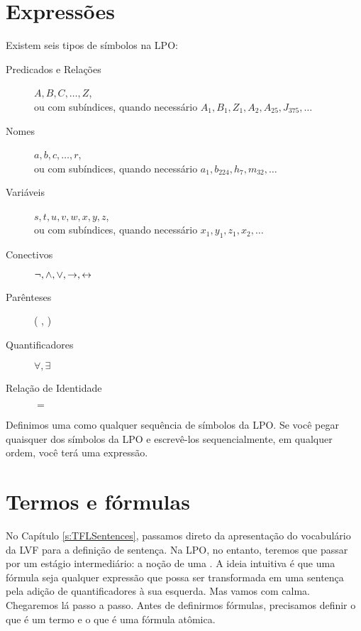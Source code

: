 \section{Expressões}
Existem seis tipos de símbolos na LPO:

\begin{description}
\item[Predicados e Relações] $A,B,C,\ldots,Z$,\\ 
	ou com subíndices, quando necessário $A_1, B_1,Z_1,A_2,A_{25},J_{375},\ldots$
\item[Nomes] $a,b,c,\ldots, r$,\\
	ou com subíndices, quando necessário $a_1, b_{224}, h_7, m_{32},\ldots$
\item[Variáveis] $s, t, u, v, w, x,y,z$,\\
	ou com subíndices, quando necessário $x_1, y_1, z_1, x_2,\ldots$
\item[Conectivos]  $\neg,\wedge,\vee,\rightarrow,\leftrightarrow$
\item[Parênteses] ( , )
\item[Quantificadores]  $\forall, \exists$
\item[Relação de Identidade] $=$
\end{description}
Definimos uma  como qualquer sequência de símbolos da LPO.
Se você pegar quaisquer dos símbolos da LPO e escrevê-los sequencialmente, em qualquer ordem, você terá uma expressão.


\section{Termos e fórmulas}
\label{s:TermsFormulas}

No Capítulo \ref{s:TFLSentences}, passamos direto da apresentação do vocabulário da LVF para a definição de sentença.
Na LPO, no entanto, teremos que passar por um estágio intermediário: a noção de uma .
A ideia intuitiva é que uma fórmula seja qualquer expressão que possa ser transformada em uma sentença pela adição de quantificadores à sua esquerda.
Mas vamos com calma.
Chegaremos lá passo a passo.
Antes de definirmos fórmulas, precisamos  definir o que é um termo e o que é uma fórmula atômica.


